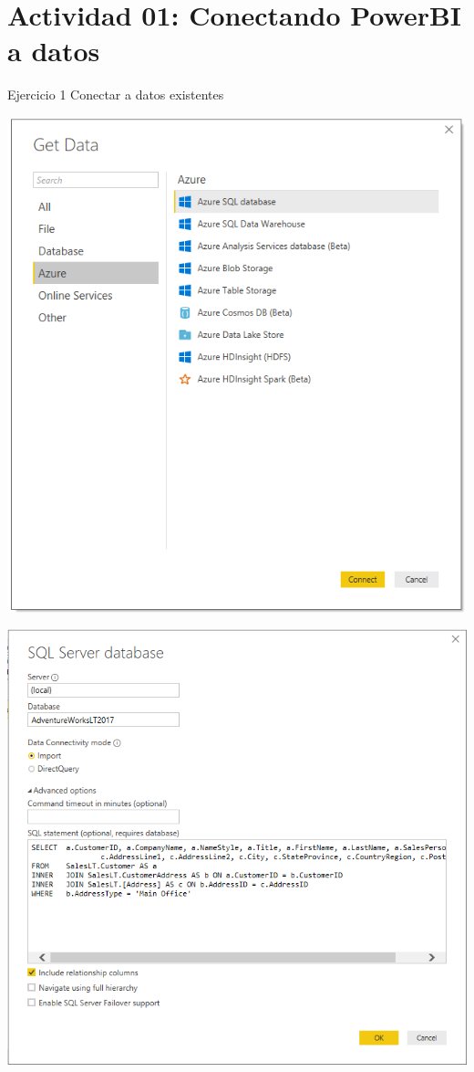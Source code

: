 \section{Actividad 01: Conectando PowerBI a datos} 


Ejercicio 1  Conectar a datos existentes \\
	\begin{center}
	\includegraphics[width=15cm]{./images/power1}
	\end{center}	

	\begin{center}
	\includegraphics[width=15cm]{./images/power2}
	\end{center}	



